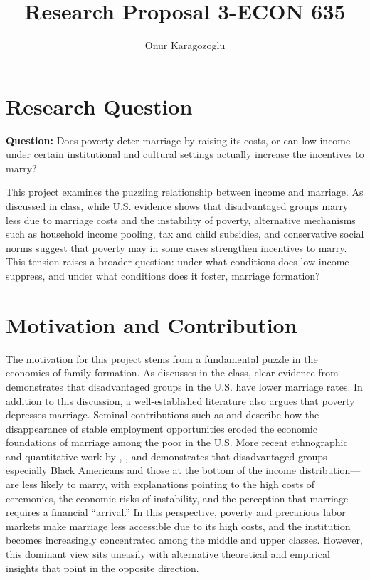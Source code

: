 

\title{Research Proposal 3-ECON 635}
\author{Onur Karagozoglu}
\date{}
\doublespacing



\maketitle

\section*{Research Question}

\textbf{Question:} Does poverty deter marriage by raising its costs, or can low income under certain institutional and cultural settings actually increase the incentives to marry?

This project examines the puzzling relationship between income and marriage. As discussed in class, while U.S. evidence shows that disadvantaged groups marry less due to marriage costs and the instability of poverty, alternative mechanisms such as household income pooling, tax and child subsidies, and conservative social norms suggest that poverty may in some cases strengthen incentives to marry. This tension raises a broader question: under what conditions does low income suppress, and under what conditions does it foster, marriage formation?

\section*{Motivation and Contribution}

The motivation for this project stems from a fundamental puzzle in the economics of family formation. As discusses in the class, clear evidence from \citet{GarciaHeckman2023} demonstrates that disadvantaged groups in the U.S. have lower marriage rates. In addition to this discussion, a well-established literature also argues that poverty depresses marriage. Seminal contributions such as \citet{Wilson1987} and \citet{Murray1994} describe how the disappearance of stable employment opportunities eroded the economic foundations of marriage among the poor in the U.S. More recent ethnographic and quantitative work by \citet{EdinKefalas2005}, \citet{Cherlin2004}, \citet{Autor2019} and \citet{GarciaHeckman2023} demonstrates that disadvantaged groups—especially Black Americans and those at the bottom of the income distribution—are less likely to marry, with explanations pointing to the high costs of ceremonies, the economic risks of instability, and the perception that marriage requires a financial “arrival.” In this perspective, poverty and precarious labor markets make marriage less accessible due to its high costs, and the institution becomes increasingly concentrated among the middle and upper classes. However, this dominant view sits uneasily with alternative theoretical and empirical insights that point in the opposite direction.

